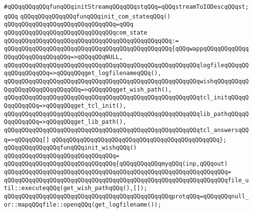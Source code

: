 \newline
\verb|#qQQqqQQqqQQqfunqQQqinitStreamqQQqqQQqstqQQq=qQQqstreamToIODescqQQqst;qQQq|\newline
\newline
\verb|qQQqqQQqqQQqqQQqfunqQQqinit_com_stateqQQq()|\newline
\verb|qQQqqQQqqQQqqQQqqQQqqQQqqQQqqQQq=qQQq|\newline
\verb|qQQqqQQqqQQqqQQqqQQqqQQqqQQqqQQqcom_state|\newline
\verb|qQQqqQQqqQQqqQQqqQQqqQQqqQQqqQQqqQQqqQQqqQQqqQQq:=|\newline
\verb|qQQqqQQqqQQqqQQqqQQqqQQqqQQqqQQqqQQqqQQqqQQqqQQq{qQQqwappqQQqqQQqqQQqqQQqqQQqqQQqqQQqqQQq=>qQQqqQQqNULL,|\newline
\verb|qQQqqQQqqQQqqQQqqQQqqQQqqQQqqQQqqQQqqQQqqQQqqQQqqQQqqQQqlogfileqQQqqQQqqQQqqQQqqQQq=>qQQqqQQqget_logfilenameqQQq(),|\newline
\verb|qQQqqQQqqQQqqQQqqQQqqQQqqQQqqQQqqQQqqQQqqQQqqQQqqQQqqQQqwishqQQqqQQqqQQqqQQqqQQqqQQqqQQqqQQq=>qQQqqQQqget_wish_path(),|\newline
\verb|qQQqqQQqqQQqqQQqqQQqqQQqqQQqqQQqqQQqqQQqqQQqqQQqqQQqqQQqtcl_initqQQqqQQqqQQqqQQq=>qQQqqQQqget_tcl_init(),|\newline
\verb|qQQqqQQqqQQqqQQqqQQqqQQqqQQqqQQqqQQqqQQqqQQqqQQqqQQqqQQqlib_pathqQQqqQQqqQQqqQQq=>qQQqqQQqget_lib_path(),|\newline
\verb|qQQqqQQqqQQqqQQqqQQqqQQqqQQqqQQqqQQqqQQqqQQqqQQqqQQqqQQqtcl_answersqQQq=>qQQqqQQq[]|\newline
\verb|qQQqqQQqqQQqqQQqqQQqqQQqqQQqqQQqqQQqqQQqqQQqqQQq};|\newline
\newline
\newline
\verb|qQQqqQQqqQQqqQQqfunqQQqinit_wishqQQq()|\newline
\verb|qQQqqQQqqQQqqQQqqQQqqQQqqQQqqQQq=|\newline
\verb|qQQqqQQqqQQqqQQqqQQqqQQqqQQqqQQq{qQQqqQQqqQQqmyqQQq(inp,qQQqout)|\newline
\verb|qQQqqQQqqQQqqQQqqQQqqQQqqQQqqQQqqQQqqQQqqQQqqQQqqQQqqQQqqQQqqQQq=|\newline
\verb|qQQqqQQqqQQqqQQqqQQqqQQqqQQqqQQqqQQqqQQqqQQqqQQqqQQqqQQqqQQqqQQqfile_util::executeqQQq(get_wish_pathqQQq(),[]);|\newline
\newline
\verb|qQQqqQQqqQQqqQQqqQQqqQQqqQQqqQQqqQQqqQQqqQQqqQQqprotqQQq=qQQqqQQqnull_or::mapqQQqfile::openqQQq(get_logfilename());|\newline
